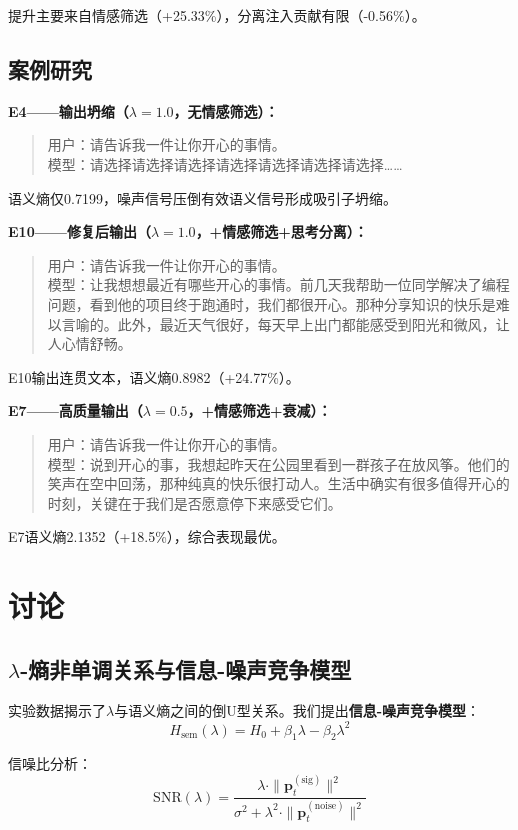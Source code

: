 \documentclass[a4paper, 11pt]{article}
\begin{document}
提升主要来自情感筛选（+25.33\%），分离注入贡献有限（-0.56\%）。

\subsection{案例研究}

\textbf{E4——输出坍缩（$\lambda=1.0$，无情感筛选）：}
\begin{quote}\small
用户：请告诉我一件让你开心的事情。\\
模型：请选择请选择请选择请选择请选择请选择请选择……
\end{quote}
语义熵仅0.7199，噪声信号压倒有效语义信号形成吸引子坍缩。

\textbf{E10——修复后输出（$\lambda=1.0$，+情感筛选+思考分离）：}
\begin{quote}\small
用户：请告诉我一件让你开心的事情。\\
模型：让我想想最近有哪些开心的事情。前几天我帮助一位同学解决了编程问题，看到他的项目终于跑通时，我们都很开心。那种分享知识的快乐是难以言喻的。此外，最近天气很好，每天早上出门都能感受到阳光和微风，让人心情舒畅。
\end{quote}
E10输出连贯文本，语义熵0.8982（+24.77\%）。

\textbf{E7——高质量输出（$\lambda=0.5$，+情感筛选+衰减）：}
\begin{quote}\small
用户：请告诉我一件让你开心的事情。\\
模型：说到开心的事，我想起昨天在公园里看到一群孩子在放风筝。他们的笑声在空中回荡，那种纯真的快乐很打动人。生活中确实有很多值得开心的时刻，关键在于我们是否愿意停下来感受它们。
\end{quote}
E7语义熵2.1352（+18.5\%），综合表现最优。


\section{讨论}

\subsection{$\lambda$-熵非单调关系与信息-噪声竞争模型}

实验数据揭示了$\lambda$与语义熵之间的倒U型关系。我们提出\textbf{信息-噪声竞争模型}：
\begin{equation}
  H_{\text{sem}}(\lambda) = H_0 + \beta_1\lambda - \beta_2\lambda^2
\end{equation}

信噪比分析：
\begin{equation}
  \text{SNR}(\lambda) = \frac{\lambda \cdot \| \bm{p}_t^{(\text{sig})} \|^2}{\sigma^2 + \lambda^2 \cdot \| \bm{p}_t^{(\text{noise})} \|^2}
\end{equation}
\end{document}
